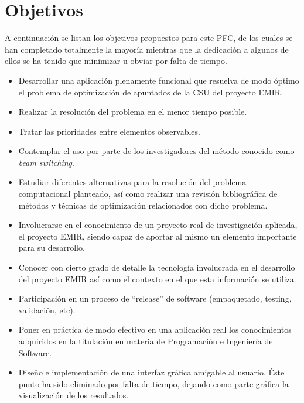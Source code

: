 %
%
%
%

\chapter{Objetivos} \label{chap:objetivos}

A continuación se listan los objetivos propuestos para este PFC,
de los cuales se han completado totalmente la mayoría mientras que
la dedicación a algunos de ellos se ha tenido que minimizar u obviar por falta de tiempo.

\begin{itemize}
\item Desarrollar una aplicación plenamente funcional que resuelva de modo
óptimo el problema de optimización de apuntados de la CSU del proyecto EMIR.
\item Realizar la resolución del problema en el menor tiempo posible.
\item Tratar las prioridades entre elementos observables.
\item Contemplar el uso por parte de los investigadores del método conocido como \textit{beam switching}.
\item Estudiar diferentes alternativas para la resolución del problema
computacional planteado, así como realizar una revisión bibliográfica de métodos
y técnicas de optimización relacionados con dicho problema.
\item Involucrarse en el conocimiento de un proyecto real de investigación
aplicada, el proyecto EMIR, siendo capaz de aportar al mismo un elemento
importante para su desarrollo.
\item Conocer con cierto grado de detalle la tecnología involucrada en el
desarrollo del proyecto EMIR así como el contexto en el que esta información se
utiliza.
\item Participación en un proceso de ``release'' de software (empaquetado,
testing, validación, etc).
\item Poner en práctica de modo efectivo en una aplicación real los
conocimientos adquiridos en la titulación en materia de Programación e
Ingeniería del Software.
\item Diseño e implementación de una interfaz gráfica amigable al usuario. Éste
punto ha sido eliminado por falta de tiempo, dejando como parte gráfica la
visualización de los resultados.
\end{itemize}
